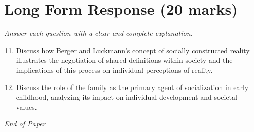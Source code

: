 \documentclass[12pt]{article}
\begin{document}
\section*{Long Form Response (20 marks)}
\textit{Answer each question with a clear and complete explanation.}
\begin{enumerate}[label=\arabic*.]
\setcounter{enumi}{10}
\item Discuss how Berger and Luckmann's concept of socially constructed reality illustrates the negotiation of shared definitions within society and the implications of this process on individual perceptions of reality.
\item Discuss the role of the family as the primary agent of socialization in early childhood, analyzing its impact on individual development and societal values.
\end{enumerate}

\vfill
\noindent\textit{End of Paper}
\end{document}
